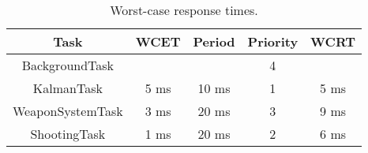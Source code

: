\begin{table}[H]
\centering
\setlength\extrarowheight{3pt}
\begin{tabulary}{\textwidth}{|C|C|C|C|C|}
\hline
\textbf{Task} & \textbf{WCET} & \textbf{Period} & \textbf{Priority} &  \textbf{WCRT} \\ 
\hline
BackgroundTask            &                           &        & 4        &                          \\
\hline
KalmanTask                & 5 ms                      & 10 ms  & 1        & 5 ms                     \\
\hline
WeaponSystemTask          & 3 ms                      & 20 ms  & 3        & 9 ms                     \\
\hline
ShootingTask              & 1 ms                      & 20 ms  & 2        & 6 ms                     \\
\hline
\end{tabulary}
\caption{Worst-case response times.}
\label{Worstcaseresponsetime}
\end{table}
\FloatBarrier